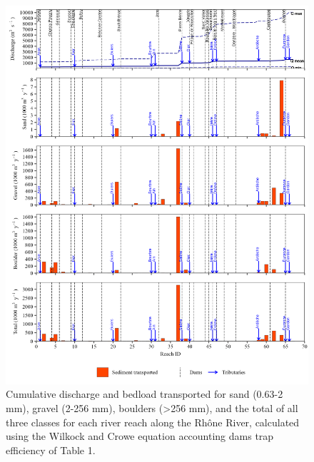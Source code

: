 \documentclass[
]{book}
\begin{document}
\begin{figure}
\includegraphics[width=26.24in]{img/res_cascade/res_E2_eW&C/plots_transp-silt/transp_res_sum_hy_E2_eW&C} \caption{Cumulative discharge and bedload transported for sand (0.63-2 mm), gravel (2-256 mm), boulders (>256 mm), and the total of all three classes for each river reach along the Rhône River, calculated using the Wilkock and Crowe equation accounting dams trap efficiency of Table 1.}\label{fig:TrE2eW}
\end{figure}
\end{document}
